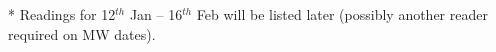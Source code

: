 \documentclass[10pt]{article}
\begin{document}
\begin{center}
{\label{tab:LABEL} 
}
* Readings for 12$^{th}$ Jan -- 16$^{th}$ Feb will be listed later (possibly another reader required on MW dates).

\end{center}
\end{document}
